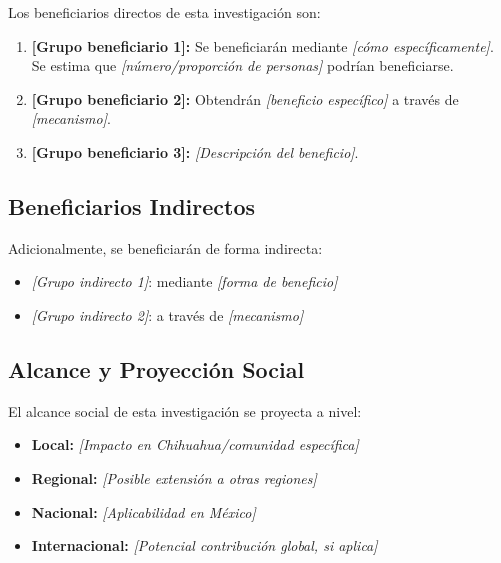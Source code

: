 Los beneficiarios directos de esta investigación son:

\begin{enumerate}
    \item \textbf{[Grupo beneficiario 1]:} Se beneficiarán mediante \textit{[cómo específicamente]}. Se estima que \textit{[número/proporción de personas]} podrían beneficiarse.
    
    \item \textbf{[Grupo beneficiario 2]:} Obtendrán \textit{[beneficio específico]} a través de \textit{[mecanismo]}.
    
    \item \textbf{[Grupo beneficiario 3]:} \textit{[Descripción del beneficio]}.
\end{enumerate}

\subsection{Beneficiarios Indirectos}

Adicionalmente, se beneficiarán de forma indirecta:

\begin{itemize}
    \item \textit{[Grupo indirecto 1]}: mediante \textit{[forma de beneficio]}
    \item \textit{[Grupo indirecto 2]}: a través de \textit{[mecanismo]}
\end{itemize}

\subsection{Alcance y Proyección Social}

El alcance social de esta investigación se proyecta a nivel:

\begin{itemize}
    \item \textbf{Local:} \textit{[Impacto en Chihuahua/comunidad específica]}
    \item \textbf{Regional:} \textit{[Posible extensión a otras regiones]}
    \item \textbf{Nacional:} \textit{[Aplicabilidad en México]}
    \item \textbf{Internacional:} \textit{[Potencial contribución global, si aplica]}
\end{itemize}

